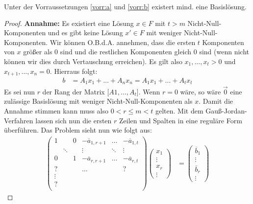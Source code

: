 \begin{theorem}
Unter der Vorraussetzungen \ref{vorr:a} und \ref{vorr:b} existert mind. eine Basislösung.
\end{theorem}
\begin{proof}
\textbf{Annahme:} Es existiert eine Lösung $x \in F$ mit $t > m$ Nicht-Null-Komponenten und es gibt keine Lösung $x' \in F$ mit weniger Nicht-Null-Komponenten.\newline\newline
Wir können O.B.d.A. annehmen, dass die ersten $t$ Komponenten von $x$ größer als $0$ sind und die restlichen Komponenten gleich $0$ sind (wenn nicht können wir dies durch Vertauschung erreichen).
Es gilt also $x_1,\dotsc,x_t > 0$ und $x_{t+1}, \dotsc,x_n=0$.
Hierraus folgt:
\begin{align}
b &= A_1x_1 + \dotsc + A_nx_n = A_1x_1 + \dotsc + A_tx_t \label{eq:x_n_t}
\end{align}
Es sei nun $r$ der Rang der Matrix $\lbrack A1, \dotsc, A_t\rbrack$. Wenn $r = 0$ wäre, so wäre $\vec 0$ eine zulässige Basislösung mit weniger Nicht-Null-Komponenten als $x$. Damit die Annahme stimmen kann muss also $0 < r \leq m < t$ gelten.
Mit dem Gauß-Jordan-Verfahren lassen sich nun die ersten $r$ Zeilen und Spalten in eine reguläre Form überführen. Das Problem sieht nun wie folgt aus:
\begin{align*}
\begin{pmatrix}
1 & & 0 & -\overline{a}_{1,r+1} &\hdots & -\overline{a}_{1,t} \\
 & \ddots & & \vdots & \ddots & \vdots \\
0 & & 1 & -\overline{a}_{r,r+1} &\hdots & -\overline{a}_{r,t} \\
? &&& \hdots && ?\\
\vdots &&&&&\\
?&&&&&\\
\end{pmatrix}\begin{pmatrix}
x_1\\
\vdots\\
x_r\\
\vdots
\end{pmatrix}&=\begin{pmatrix}
\overline{b}_1\\
\vdots\\
\overline{b}_r\\
\vdots
\end{pmatrix}
\end{align*}


\end{proof}
